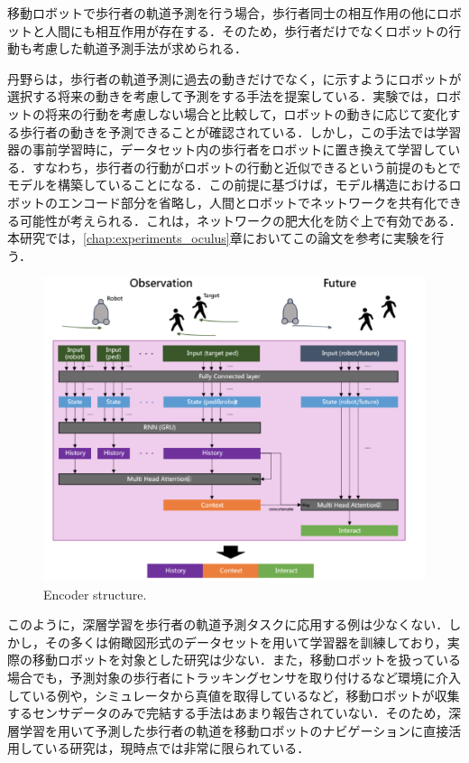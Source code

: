 \protect{}

\newpage

移動ロボットで歩行者の軌道予測を行う場合，歩行者同士の相互作用の他にロボットと人間にも相互作用が存在する．そのため，歩行者だけでなくロボットの行動も考慮した軌道予測手法が求められる．

丹野ら\cite{si2023-tanno}は，歩行者の軌道予測に過去の動きだけでなく，に示すようにロボットが選択する将来の動きを考慮して予測をする手法を提案している．実験では，ロボットの将来の行動を考慮しない場合と比較して，ロボットの動きに応じて変化する歩行者の動きを予測できることが確認されている．しかし，この手法では学習器の事前学習時に，データセット内の歩行者をロボットに置き換えて学習している．すなわち，歩行者の行動がロボットの行動と近似できるという前提のもとでモデルを構築していることになる．この前提に基づけば，モデル構造におけるロボットのエンコード部分を省略し，人間とロボットでネットワークを共有化できる可能性が考えられる．これは，ネットワークの肥大化を防ぐ上で有効である．
本研究では，\ref{chap:experiments_oculus}章においてこの論文\cite{si2023-tanno}を参考に実験を行う．
\begin{figure}[hbtp]
     \centering
    \includegraphics[keepaspectratio, scale=0.64]
         {images/future-robot.png}
    \caption{Encoder structure.\protect\footnotemark[5]}
    \label{Fig:future-robot}
\end{figure}
\protect{}

このように，深層学習を歩行者の軌道予測タスクに応用する例は少なくない．しかし，その多くは俯瞰図形式のデータセットを用いて学習器を訓練しており，実際の移動ロボットを対象とした研究は少ない．また，移動ロボットを扱っている場合でも，予測対象の歩行者にトラッキングセンサを取り付けるなど環境に介入している例や，シミュレータから真値を取得しているなど，移動ロボットが収集するセンサデータのみで完結する手法はあまり報告されていない．そのため，深層学習を用いて予測した歩行者の軌道を移動ロボットのナビゲーションに直接活用している研究は，現時点では非常に限られている．

\newpage